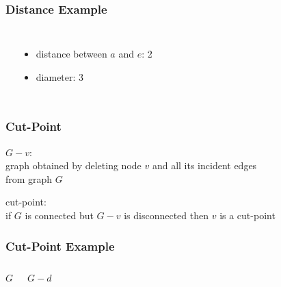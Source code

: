 \documentclass[dvipsnames]{beamer}
\begin{document}
\begin{frame}
  \frametitle{Distance Example}

  \begin{example}
    \begin{columns}
      \begin{center}
      \end{center}

      \pause
      \begin{itemize}
        \item distance between $a$ and $e$: 2\\
        \item diameter: 3
      \end{itemize}
    \end{columns}
  \end{example}
\end{frame}

\begin{frame}
  \frametitle{Cut-Point}

  \begin{definition}
    \alert{$G - v$}:\\
    graph obtained by deleting node $v$ and all its incident edges\\
    from graph $G$
  \end{definition}

  \pause
  \begin{definition}
    \alert{cut-point}:\\
    if $G$ is connected but $G - v$ is disconnected then $v$ is a cut-point
  \end{definition}
\end{frame}

\begin{frame}
  \frametitle{Cut-Point Example}

  \begin{columns}
    \begin{block}{$G$}
      \begin{center}
      \end{center}
    \end{block}

    \begin{block}{$G - d$}
      \begin{center}
      \end{center}
    \end{block}
  \end{columns}
\end{frame}
\end{document}
